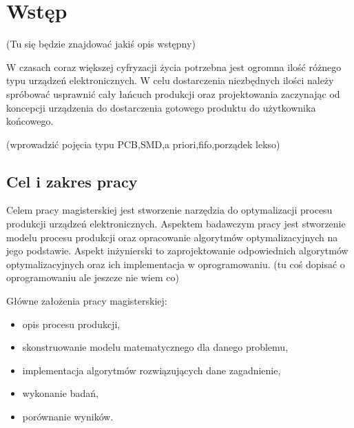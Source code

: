 \chapter{Wstęp}

(Tu się będzie znajdować jakiś opis wstępny)

W czasach coraz większej cyfryzacji życia potrzebna jest ogromna ilość różnego typu urządzeń elektronicznych.
W celu dostarczenia niezbędnych ilości należy spróbować usprawnić cały łańcuch produkcji oraz projektowania zaczynając od koncepcji urządzenia do dostarczenia gotowego produktu do użytkownika końcowego.

(wprowadzić pojęcia typu PCB,SMD,a priori,fifo,porządek lekso)

\section{Cel i zakres pracy}
Celem pracy magisterskiej jest stworzenie narzędzia do optymalizacji procesu produkcji urządzeń elektronicznych.
Aspektem badawczym pracy jest stworzenie modelu procesu produkcji oraz opracowanie algorytmów optymalizacyjnych na jego podstawie.
Aspekt inżynierski to zaprojektowanie odpowiednich algorytmów optymalizacyjnych oraz ich implementacja w oprogramowaniu. (tu coś dopisać o oprogramowaniu ale jeszcze nie wiem co)

\breakparagraph{}
Główne założenia pracy magisterskiej:
\begin{itemize}
    \item opis procesu produkcji,
    \item skonstruowanie modelu matematycznego dla danego problemu,
    \item implementacja algorytmów rozwiązujących dane zagadnienie,
    \item wykonanie badań,
    \item porównanie wyników.
\end{itemize}

